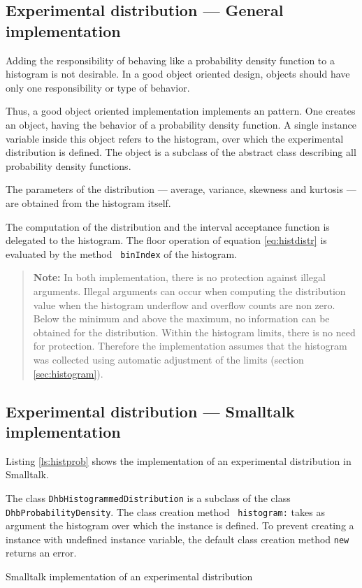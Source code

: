 \subsection{Experimental distribution --- General  implementation}
 Adding the responsibility of
behaving like a probability density function to a histogram is not
desirable. In a good object oriented design, objects should have
only one responsibility or type of behavior.

Thus, a good object oriented implementation implements an
 pattern. One creates an object, having the
behavior of a probability density function. A single instance
variable inside this object refers to the histogram, over which
the experimental distribution is defined. The 
object is a subclass of the abstract class describing all
probability density functions.

The parameters of the distribution --- average, variance, skewness
and kurtosis --- are obtained from the histogram itself.

The computation of the distribution and the interval acceptance
function is delegated to the histogram. The floor operation of
equation \ref{eq:histdistr} is evaluated by the method {\tt
binIndex} of the histogram.

\begin{quote}
{\bf Note:} In both implementation, there is no protection against
illegal arguments. Illegal arguments can occur when computing the
distribution value when the histogram underflow and overflow
counts are non zero. Below the minimum and above the maximum, no
information can be obtained for the distribution. Within the
histogram limits, there is no need for protection. Therefore the
implementation assumes that the histogram was collected using
automatic adjustment of the limits (\cf section
\ref{sec:histogram}).
\end{quote}

\subsection{Experimental distribution --- Smalltalk  implementation}
Listing \ref{ls:histprob} shows the implementation of an
experimental distribution in Smalltalk.

The class {\tt DhbHistogrammedDistribution} is a subclass of the
class {\tt DhbProbabilityDensity}. The class creation method {\tt
histogram:} takes as argument the histogram over which the
instance is defined. To prevent creating a instance with undefined
instance variable, the default class creation method {\tt new}
returns an error.

\begin{listing} Smalltalk implementation of an experimental distribution \label{ls:histprob}

\end{listing}




